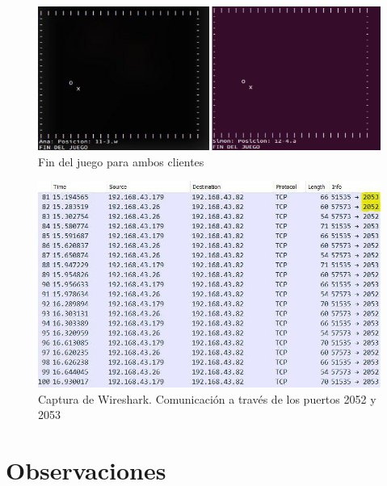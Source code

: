 \begin{figure}[h]
	\centering
	\includegraphics[width=1\textwidth]{img/esta}
	\caption{Fin del juego para ambos clientes}
\end{figure}





\newpage


\begin{figure}[h]
	\centering
	\includegraphics[width=.9\textwidth]{img/7}
	\caption{Captura de Wireshark. Comunicación a través de los puertos 2052 y 2053}
\end{figure}

\newpage

\section{Observaciones}



